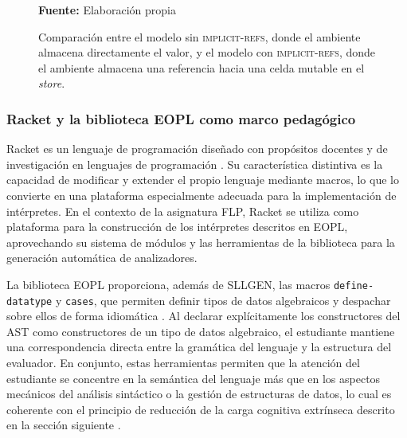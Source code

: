 \begin{figure}[htbp]
\centering

\caption{Comparación entre el modelo sin \textsc{implicit-refs}, donde el ambiente almacena directamente el valor, y el modelo con \textsc{implicit-refs}, donde el ambiente almacena una referencia hacia una celda mutable en el \textit{store}.}
\scriptsize \textbf{Fuente:} Elaboración propia
\label{fig:implicit-refs}
\end{figure}

\subsubsection{Racket y la biblioteca EOPL como marco pedagógico}

Racket es un lenguaje de programación diseñado con propósitos docentes y de investigación en lenguajes de programación \cite{felleisen2018racket}. Su característica distintiva es la capacidad de modificar y extender el propio lenguaje mediante macros, lo que lo convierte en una plataforma especialmente adecuada para la implementación de intérpretes. En el contexto de la asignatura FLP, Racket se utiliza como plataforma para la construcción de los intérpretes descritos en EOPL, aprovechando su sistema de módulos y las herramientas de la biblioteca para la generación automática de analizadores.

La biblioteca EOPL proporciona, además de SLLGEN, las macros \texttt{define-datatype} y \texttt{cases}, que permiten definir tipos de datos algebraicos y despachar sobre ellos de forma idiomática \cite{Friedman2008EPL}. Al declarar explícitamente los constructores del AST como constructores de un tipo de datos algebraico, el estudiante mantiene una correspondencia directa entre la gramática del lenguaje y la estructura del evaluador. En conjunto, estas herramientas permiten que la atención del estudiante se concentre en la semántica del lenguaje más que en los aspectos mecánicos del análisis sintáctico o la gestión de estructuras de datos, lo cual es coherente con el principio de reducción de la carga cognitiva extrínseca descrito en la sección siguiente \cite{sweller2024cognitive}.
